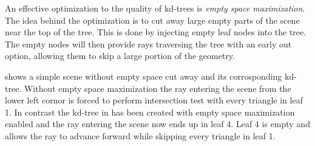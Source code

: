 An effective optimization to the quality of kd-trees is \textit{empty
  space maximization}. The idea behind the optimization is to cut away
large empty parts of the scene near the top of the tree. This is done
by injecting empty leaf nodes into the tree. The empty nodes will then
provide rays traversing the tree with an early out option, allowing
them to skip a large portion of the geometry.

 shows a simple scene without empty
space cut away and its corrosponding kd-tree. Without empty space
maximization the ray entering the scene from the lower left cornor is
forced to perform intersection test with every triangle in leaf 1. In
contrast the kd-tree in  has been
created with empty space maximization enabled and the ray entering the
scene now ends up in leaf 4. Leaf 4 is empty and allows the ray to
advance forward while skipping every triangle in leaf 1.

